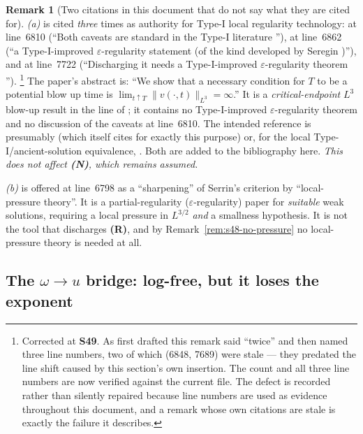 \documentclass[11pt]{article}
\theoremstyle{definition}
\newtheorem{remark}[theorem]{Remark}
\theoremstyle{remark}
\begin{document}
\begin{remark}[Two citations in this document that do not say what they are
  cited for]\label{rem:s48-miscitations}
  \emph{(a)} \cite{Seregin2012} is cited \emph{three} times as authority for
  Type-I local regularity technology: at line~6810 (``Both caveats are
  standard in the Type-I literature \cite{Seregin2012}''), at line~6862 (``a
  Type-I-improved $\varepsilon$-regularity statement (of the kind developed by
  Seregin \cite{Seregin2012})''), and at line~7722 (``Discharging it needs a
  Type-I-improved $\varepsilon$-regularity theorem \cite{Seregin2012}'').%
  \footnote{Corrected at \textbf{S49}. As first drafted this remark said
  ``twice'' and then named three line numbers, two of which (6848, 7689) were
  stale --- they predated the line shift caused by this section's own
  insertion. The count and all three line numbers are now verified against
  the current file. The defect is recorded rather than silently repaired
  because line numbers are used as evidence throughout this document, and a
  remark whose own citations are stale is exactly the failure it describes.} The paper's abstract is: ``We show that a
  necessary condition for $T$ to be a potential blow up time is
  $\lim_{t\uparrow T}\|v(\cdot,t)\|_{L^3}=\infty$.'' It is a
  \emph{critical-endpoint} $L^3$ blow-up result in the line of
  \cite{EscauriazaSereginSverak2003}; it contains no Type-I-improved
  $\varepsilon$-regularity theorem and no discussion of the caveats at
  line~6810. The intended reference is presumably
  \cite{SereginSverak2009} (which \cite{Seregin2012} itself cites for exactly
  this purpose) or, for the local Type-I/ancient-solution equivalence,
  \cite{AlbrittonBarker2019}. Both are added to the bibliography here.
  \emph{This does not affect \textbf{(N)}, which remains assumed.}

  \emph{(b)} \cite{LadyzhenskayaSeregin1999} is offered at line~6798 as a
  ``sharpening'' of Serrin's criterion by ``local-pressure theory''. It is a
  partial-regularity ($\varepsilon$-regularity) paper for \emph{suitable} weak
  solutions, requiring a local pressure in $L^{3/2}$ \emph{and} a smallness
  hypothesis. It is not the tool that discharges \textbf{(R)}, and by
  Remark~\ref{rem:s48-no-pressure} no local-pressure theory is needed at all.
\end{remark}

\subsection{The \texorpdfstring{$\omega\to u$}{omega-to-u} bridge: log-free, but it loses the exponent}
\label{subsec:s48-bridge}
\end{document}
